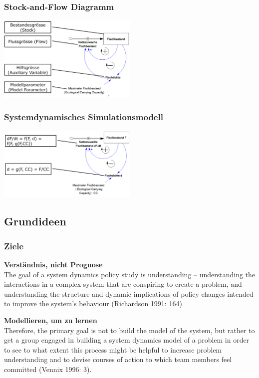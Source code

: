 \begin{multicols}{2}
	\subsubsection{Stock-and-Flow Diagramm}
	\includegraphics[width=0.5\textwidth]{pictures/stock_and_flow_diagramm}
	
	\subsubsection{Systemdynamisches Simulationsmodell}
	\includegraphics[width=0.5\textwidth]{pictures/systemdynamisches_simulationsmodell}
\end{multicols}	

\subsection{Grundideen}
\subsubsection{Ziele}
\begin{compactitem}
	\item \textbf{Verständnis, nicht Prognose} \\
	The goal of a system dynamics policy study is understanding – understanding the interactions in a complex system that are 	conspiring to create a problem, and understanding the structure	and dynamic implications of policy changes intended to improve	the system's behaviour (Richardson 1991: 164)
	\item \textbf{Modellieren, um zu lernen} \\
	Therefore, the primary goal is not to build the model of the system, but rather to get a group engaged in building a system dynamics model of a problem in order to see to what	extent this process might be helpful to increase problem understanding and to devise courses of action to which team members feel committed (Vennix 1996: 3).
\end{compactitem}

